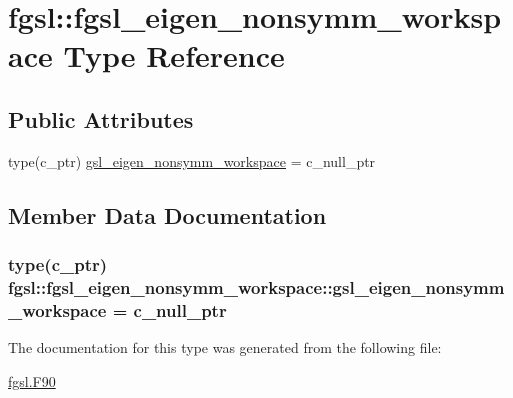\hypertarget{structfgsl_1_1fgsl__eigen__nonsymm__workspace}{\section{fgsl\-:\-:fgsl\-\_\-eigen\-\_\-nonsymm\-\_\-workspace Type Reference}
\label{structfgsl_1_1fgsl__eigen__nonsymm__workspace}
}
\subsection*{Public Attributes}
\begin{DoxyCompactItemize}
\item 
type(c\-\_\-ptr) \hyperlink{structfgsl_1_1fgsl__eigen__nonsymm__workspace_a6588dacfb8c71634b2b0b4ae86637323}{gsl\-\_\-eigen\-\_\-nonsymm\-\_\-workspace} = c\-\_\-null\-\_\-ptr
\end{DoxyCompactItemize}


\subsection{Member Data Documentation}
\hypertarget{structfgsl_1_1fgsl__eigen__nonsymm__workspace_a6588dacfb8c71634b2b0b4ae86637323}{
\subsubsection[{gsl\-\_\-eigen\-\_\-nonsymm\-\_\-workspace}]{\setlength{\rightskip}{0pt plus 5cm}type(c\-\_\-ptr) fgsl\-::fgsl\-\_\-eigen\-\_\-nonsymm\-\_\-workspace\-::gsl\-\_\-eigen\-\_\-nonsymm\-\_\-workspace = c\-\_\-null\-\_\-ptr}}\label{structfgsl_1_1fgsl__eigen__nonsymm__workspace_a6588dacfb8c71634b2b0b4ae86637323}


The documentation for this type was generated from the following file\-:\begin{DoxyCompactItemize}
\item 
\hyperlink{fgsl_8F90}{fgsl.\-F90}\end{DoxyCompactItemize}
